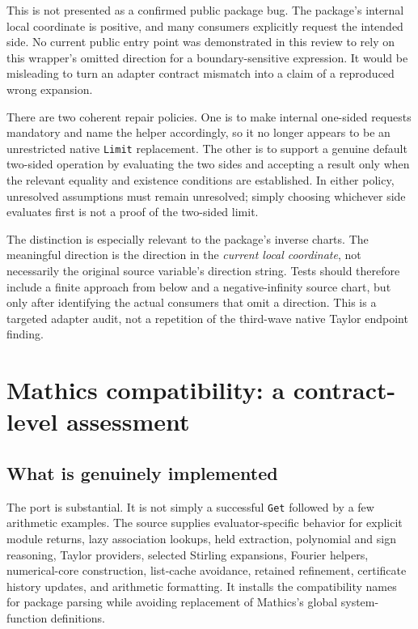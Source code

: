 \documentclass[11pt,a4paper]{article}
\newcommand{\code}[1]{\texttt{#1}}
\begin{document}
This is not presented as a confirmed public package bug. The package's internal local coordinate is positive, and many consumers explicitly request the intended side. No current public entry point was demonstrated in this review to rely on this wrapper's omitted direction for a boundary-sensitive expression. It would be misleading to turn an adapter contract mismatch into a claim of a reproduced wrong expansion.

There are two coherent repair policies. One is to make internal one-sided requests mandatory and name the helper accordingly, so it no longer appears to be an unrestricted native \code{Limit} replacement. The other is to support a genuine default two-sided operation by evaluating the two sides and accepting a result only when the relevant equality and existence conditions are established. In either policy, unresolved assumptions must remain unresolved; simply choosing whichever side evaluates first is not a proof of the two-sided limit.

The distinction is especially relevant to the package's inverse charts. The meaningful direction is the direction in the \emph{current local coordinate}, not necessarily the original source variable's direction string. Tests should therefore include a finite approach from below and a negative-infinity source chart, but only after identifying the actual consumers that omit a direction. This is a targeted adapter audit, not a repetition of the third-wave native Taylor endpoint finding.

\section{Mathics compatibility: a contract-level assessment}
\label{sec:mathics}
\subsection{What is genuinely implemented}
The port is substantial. It is not simply a successful \code{Get} followed by a few arithmetic examples. The source supplies evaluator-specific behavior for explicit module returns, lazy association lookups, held extraction, polynomial and sign reasoning, Taylor providers, selected Stirling expansions, Fourier helpers, numerical-core construction, list-cache avoidance, retained refinement, certificate history updates, and arithmetic formatting. It installs the compatibility names for package parsing while avoiding replacement of Mathics's global system-function definitions.\cite{mathicsguide,compat,kernelmap}
\end{document}
